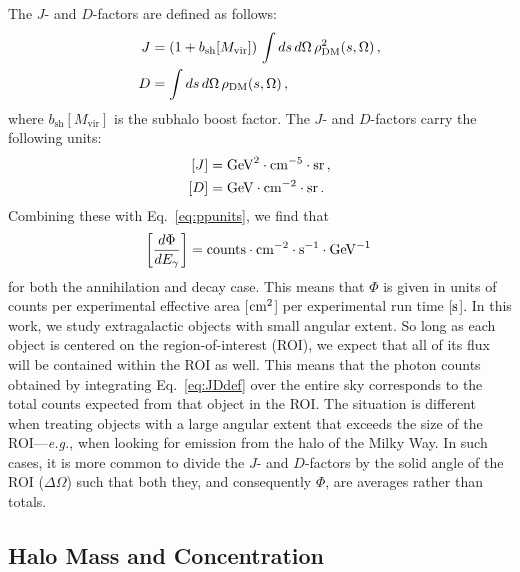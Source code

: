 The $J$- and $D$-factors are defined as follows:
\begin{equation}\begin{aligned}
J &= \left(1+b_\text{sh}[M_\text{vir}]\right)\,\int ds \, d\Omega \,\rho_{\rm DM}^2(s,\Omega) \,, \\
D &= \int ds\, d\Omega\, \rho_{\rm DM}(s,\Omega)\,,
\label{eq:JDdef}
\end{aligned}\end{equation}
where $b_\text{sh}[M_\text{vir}]$ is the subhalo boost factor.  The $J$- and $D$-factors carry the following units:
\begin{equation}\begin{aligned}
\left[ J \right] &= {\rm GeV}^2 \cdot {\rm cm}^{-5} \cdot {\rm sr}\,, \\
\left[ D \right] &= {\rm GeV} \cdot {\rm cm}^{-2} \cdot {\rm sr}\,.
\end{aligned}\end{equation}
Combining these with Eq.~\ref{eq:ppunits}, we find that 
\begin{equation}
\left[ \frac{d\Phi}{dE_{\gamma}} \right] = {\rm counts} \cdot {\rm cm}^{-2} \cdot {\rm s}^{-1} \cdot {\rm GeV}^{-1}\,
\end{equation}
for both the annihilation and decay case.  This means that $\Phi$ is given in units of counts per experimental effective area [${\rm cm}^2$] per experimental run time [${\rm s}$].  
In this work, we study extragalactic objects with small angular extent.  So long as each object is centered on the region-of-interest (ROI), we expect that all of its flux will be contained within the ROI as well.  This means that the photon counts obtained by integrating Eq.~\ref{eq:JDdef} over the entire sky corresponds to the total counts expected from that object in the ROI.  The situation is different when treating objects with a large angular extent that exceeds the size of the ROI---\emph{e.g.}, when looking for emission from the halo of the Milky Way.  In such cases, it is more common to divide the $J$- and $D$-factors by the solid angle of the ROI ($\Delta \Omega$) such that both they, and consequently $\Phi$, are averages rather than totals.  

\subsection{Halo Mass and Concentration}

